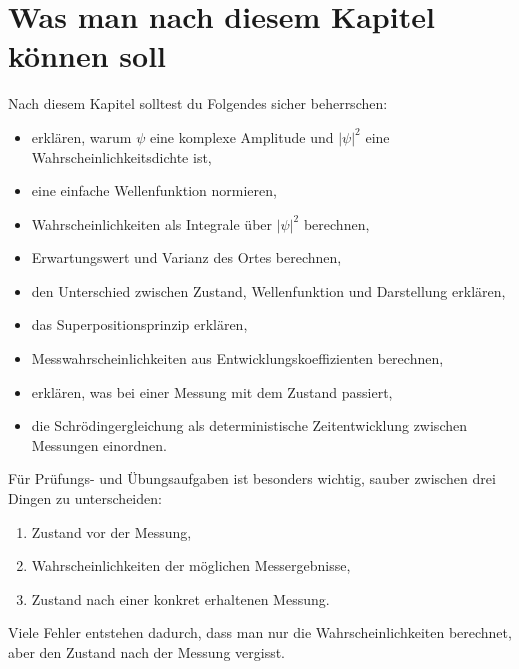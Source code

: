 \section{Was man nach diesem Kapitel können soll}

Nach diesem Kapitel solltest du Folgendes sicher beherrschen:
\begin{itemize}
    \item erklären, warum $\psi$ eine komplexe Amplitude und $|\psi|^2$ eine Wahrscheinlichkeitsdichte ist,
    \item eine einfache Wellenfunktion normieren,
    \item Wahrscheinlichkeiten als Integrale über $|\psi|^2$ berechnen,
    \item Erwartungswert und Varianz des Ortes berechnen,
    \item den Unterschied zwischen Zustand, Wellenfunktion und Darstellung erklären,
    \item das Superpositionsprinzip erklären,
    \item Messwahrscheinlichkeiten aus Entwicklungskoeffizienten berechnen,
    \item erklären, was bei einer Messung mit dem Zustand passiert,
    \item die Schrödingergleichung als deterministische Zeitentwicklung zwischen Messungen einordnen.
\end{itemize}

\begin{examtipbox}
Für Prüfungs- und Übungsaufgaben ist besonders wichtig, sauber zwischen drei Dingen zu unterscheiden:
\begin{enumerate}
    \item Zustand vor der Messung,
    \item Wahrscheinlichkeiten der möglichen Messergebnisse,
    \item Zustand nach einer konkret erhaltenen Messung.
\end{enumerate}
Viele Fehler entstehen dadurch, dass man nur die Wahrscheinlichkeiten berechnet, aber den Zustand nach der Messung vergisst.
\end{examtipbox}
